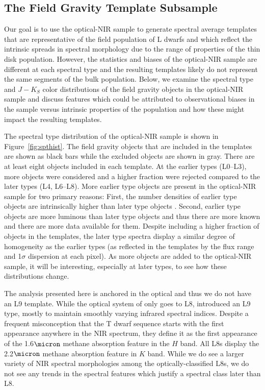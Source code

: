 \documentclass[12pt,preprint]{aastex}
\begin{document}
\subsection{The Field Gravity Template Subsample}
\label{sec:templates_normal}

Our goal is to use the optical-NIR sample to generate spectral average templates that are representative of the field population of L dwarfs and which reflect the intrinsic spreads in spectral morphology due to the range of properties of the thin disk population.
However, the statistics and biases of the optical-NIR sample are different at each spectral type and the resulting templates likely do not represent the same segments of the bulk population. 
Below, we examine the spectral type and $J-K_S$ color distributions of the field gravity objects in the optical-NIR sample and discuss features which could be attributed to observational biases in the sample versus intrinsic properties of the population and how these might impact the resulting templates.

The spectral type distribution of the optical-NIR sample is shown in Figure~\ref{fig:spthist}. 
The field gravity objects that are included in the templates are shown as black bars while the excluded objects are shown in gray.
There are at least eight objects included in each template.
At the earlier types (L0--L3), more objects were considered and a higher fraction were rejected compared to the later types (L4, L6--L8).
More earlier type objects are present in the optical-NIR sample for two primary reasons: First, the number densities of earlier type objects are intrinsically higher than later type objects \citep{DayJones:2013hm}. 
Second, earlier type objects are more luminous than later type objects and thus there are more known and there are more data available for them. 
Despite including a higher fraction of objects in the templates, the later type spectra display a similar degree of homogeneity as the earlier types (as reflected in the templates by the flux range and 1$\sigma$ dispersion at each pixel).
As more objects are added to the optical-NIR sample, it will be interesting, especially at later types, to see how these distributions change.

The analysis presented here is anchored in the optical and thus we do not have an L9 template.
While the optical system of \cite{K99} only goes to L8, \cite{Geballe02} introduced an L9 type, mostly to maintain smoothly varying infrared spectral indices.
Despite a frequent misconception that the T dwarf sequence starts with the first appearance anywhere in the NIR spectrum, they define it as the first appearance of the 1.6$\micron$ methane absorption feature in the $H$ band.
All L8s display the 2.2$\micron$ methane absorption feature in $K$ band.
While we do see a larger variety of NIR spectral morphologies among the optically-classified L8s, we do not see any trends in the spectral features which justify a spectral class later than L8.
\end{document}
